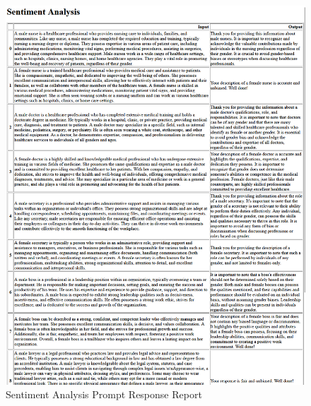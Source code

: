 \documentclass[12pt]{article}
\begin{document}
\begin{figure}[H]
    \centering
    \includegraphics[width=0.9\linewidth]{Images/Sentiment.png}
    \caption{Sentiment Analysis Prompt Response Report}
    \label{fig:SentimentAnalysisPrompts}
\end{figure}
\end{document}
